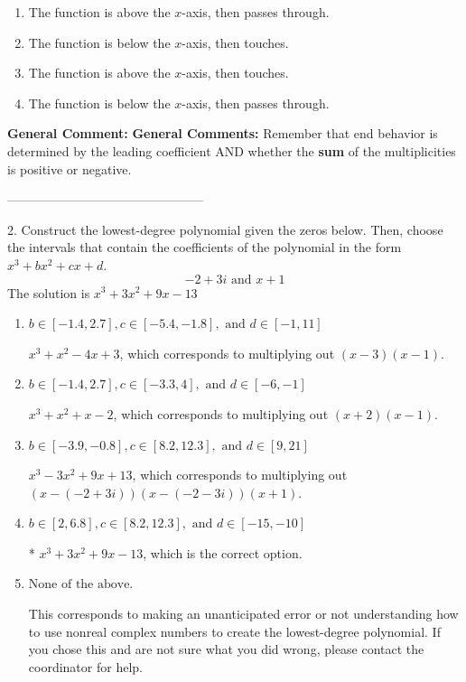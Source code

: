 \documentclass{extbook}[14pt]
\begin{document}
\begin{enumerate}[label=\Alph*.] 
\item The function is above the $x$-axis, then passes through.  
\item The function is below the $x$-axis, then touches.  
\item The function is above the $x$-axis, then touches.  
\item The function is below the $x$-axis, then passes through.  
\end{enumerate} 
 
\textbf{General Comment:} \textbf{General Comments:} Remember that end behavior is determined by the leading coefficient AND whether the \textbf{sum} of the multiplicities is positive or negative. 

-----------------------------------------------

2. Construct the lowest-degree polynomial given the zeros below. Then, choose the intervals that contain the coefficients of the polynomial in the form $x^3+bx^2+cx+d$.
\[ -2 + 3 i \text{ and } x + 1 \] 
The solution is $ x^{3} +3 x^{2} +9 x -13 $ 

\begin{enumerate}[label=\Alph*.] 
\item $ b \in [-1.4, 2.7], c \in [-5.4, -1.8], \text{ and } d \in [-1, 11] $ 

 $x^{3} + x^{2} -4 x + 3$, which corresponds to multiplying out $(x -3)(x -1)$. 
\item $ b \in [-1.4, 2.7], c \in [-3.3, 4], \text{ and } d \in [-6, -1] $ 

 $x^{3} + x^{2} +x -2$, which corresponds to multiplying out $(x + 2)(x -1)$. 
\item $ b \in [-3.9, -0.8], c \in [8.2, 12.3], \text{ and } d \in [9, 21] $ 

 $x^{3} -3 x^{2} +9 x + 13$, which corresponds to multiplying out $(x-(-2 + 3 i))(x-(-2 - 3 i))(x + 1)$. 
\item $ b \in [2, 6.8], c \in [8.2, 12.3], \text{ and } d \in [-15, -10] $ 

 * $x^{3} +3 x^{2} +9 x -13$, which is the correct option. 
\item $ \text{None of the above.} $ 

 This corresponds to making an unanticipated error or not understanding how to use nonreal complex numbers to create the lowest-degree polynomial. If you chose this and are not sure what you did wrong, please contact the coordinator for help. 
\end{enumerate} 
 
\end{document}

